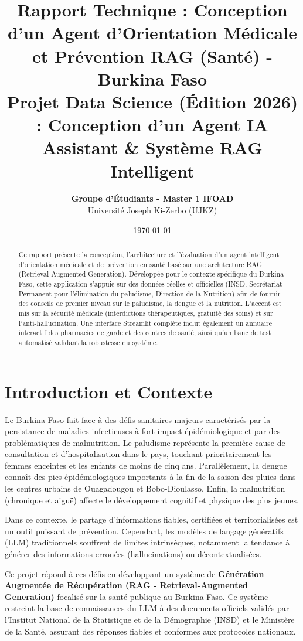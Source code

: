 \documentclass[12pt,a4paper]{article}
\title{
    \vspace{-2cm}
    \textbf{Rapport Technique : Conception d'un Agent d'Orientation Médicale et Prévention RAG (Santé) - Burkina Faso}\\
    \Large{Projet Data Science (Édition 2026) : Conception d'un Agent IA Assistant \& Système RAG Intelligent}
}
\author{
    \textbf{Groupe d'Étudiants - Master 1 IFOAD}\\
    Université Joseph Ki-Zerbo (UJKZ)
}
\date{\today}
\begin{document}
\maketitle

\begin{abstract}
Ce rapport présente la conception, l'architecture et l'évaluation d'un agent intelligent d'orientation médicale et de prévention en santé basé sur une architecture RAG (Retrieval-Augmented Generation). Développée pour le contexte spécifique du Burkina Faso, cette application s'appuie sur des données réelles et officielles (INSD, Secrétariat Permanent pour l'élimination du paludisme, Direction de la Nutrition) afin de fournir des conseils de premier niveau sur le paludisme, la dengue et la nutrition. L'accent est mis sur la sécurité médicale (interdictions thérapeutiques, gratuité des soins) et sur l'anti-hallucination. Une interface Streamlit complète inclut également un annuaire interactif des pharmacies de garde et des centres de santé, ainsi qu'un banc de test automatisé validant la robustesse du système.
\end{abstract}

\newpage
\tableofcontents
\newpage

\section{Introduction et Contexte}
Le Burkina Faso fait face à des défis sanitaires majeurs caractérisés par la persistance de maladies infectieuses à fort impact épidémiologique et par des problématiques de malnutrition. Le paludisme représente la première cause de consultation et d'hospitalisation dans le pays, touchant prioritairement les femmes enceintes et les enfants de moins de cinq ans. Parallèlement, la dengue connaît des pics épidémiologiques importants à la fin de la saison des pluies dans les centres urbains de Ouagadougou et Bobo-Dioulasso. Enfin, la malnutrition (chronique et aiguë) affecte le développement cognitif et physique des plus jeunes.

Dans ce contexte, le partage d'informations fiables, certifiées et territorialisées est un outil puissant de prévention. Cependant, les modèles de langage génératifs (LLM) traditionnels souffrent de limites intrinsèques, notamment la tendance à générer des informations erronées (hallucinations) ou décontextualisées.

Ce projet répond à ces défis en développant un système de \textbf{Génération Augmentée de Récupération (RAG - Retrieval-Augmented Generation)} focalisé sur la santé publique au Burkina Faso. Ce système restreint la base de connaissances du LLM à des documents officiels validés par l'Institut National de la Statistique et de la Démographie (INSD) et le Ministère de la Santé, assurant des réponses fiables et conformes aux protocoles nationaux.
\end{document}
